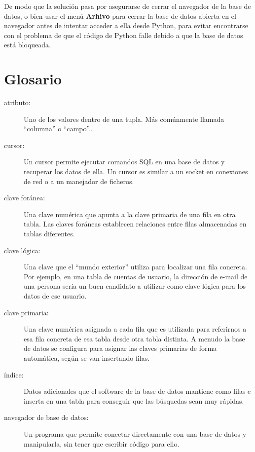 De modo que la solución pasa por asegurarse de cerrar el navegador de la base de datos,
o bien usar el menú {\bf Arhivo} para cerrar la base de datos abierta en el navegador
antes de intentar acceder a ella desde Python, para evitar encontrarse con
el problema de que el código de Python falle debido a que la base de datos
está bloqueada.

\section{Glosario}

\begin{description}

\item[atributo:] Uno de los valores dentro de una tupla. Más comúnmente
llamada ``columna'' o ``campo''..

\item[cursor:] Un cursor permite ejecutar comandos SQL en una base de datos
y recuperar los datos de ella. Un cursor es similar a un
socket en conexiones de red o a un manejador de ficheros.

\item[clave foránea:] Una clave numérica que apunta a la clave primaria de
una fila en otra tabla. Las claves foráneas establecen relaciones entre filas
almacenadas en tablas diferentes.

\item[clave lógica:] Una clave que el ``mundo exterior'' utiliza para localizar una fila
concreta. Por ejemplo, en una tabla de cuentas de usuario, la dirección de e-mail de una persona
sería un buen candidato a utilizar como clave lógica para los datos de ese usuario.

\item[clave primaria:] Una clave numérica asignada a cada fila que es utilizada para
referirnos a esa fila concreta de esa tabla desde otra tabla distinta. A menudo la base de datos
se configura para asignar las claves primarias de forma automática, según se van insertando filas.

\item[índice:] Datos adicionales que el software de la base de datos mantiene como filas
e inserta en una tabla para conseguir que las búsquedas sean muy rápidas.

\item[navegador de base de datos:]
Un programa que permite conectar directamente con una base de datos
y manipularla, sin tener que escribir código para ello.


\end{description}

